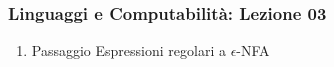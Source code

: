 




\begin{frame}[fragile]
	\frametitle{Linguaggi e Computabilità: Lezione 03}
\begin{enumerate}
\item
Passaggio Espressioni regolari a $\epsilon$-NFA
\end{enumerate}
\end{frame}



